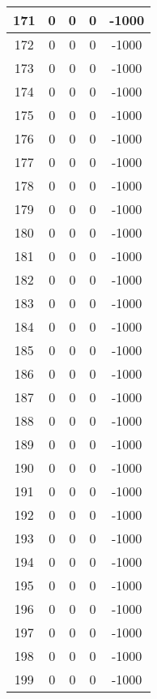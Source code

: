 \documentclass[letterpaper, 12pt]{article}
\begin{document}
\begin{longtable}{|c|c|c|c|c|}
\hline
171 & 0 & 0 & 0 & -1000 \\
\hline
172 & 0 & 0 & 0 & -1000 \\
\hline
173 & 0 & 0 & 0 & -1000 \\
\hline
174 & 0 & 0 & 0 & -1000 \\
\hline
175 & 0 & 0 & 0 & -1000 \\
\hline
176 & 0 & 0 & 0 & -1000 \\
\hline
177 & 0 & 0 & 0 & -1000 \\
\hline
178 & 0 & 0 & 0 & -1000 \\
\hline
179 & 0 & 0 & 0 & -1000 \\
\hline
180 & 0 & 0 & 0 & -1000 \\
\hline
181 & 0 & 0 & 0 & -1000 \\
\hline
182 & 0 & 0 & 0 & -1000 \\
\hline
183 & 0 & 0 & 0 & -1000 \\
\hline
184 & 0 & 0 & 0 & -1000 \\
\hline
185 & 0 & 0 & 0 & -1000 \\
\hline
186 & 0 & 0 & 0 & -1000 \\
\hline
187 & 0 & 0 & 0 & -1000 \\
\hline
188 & 0 & 0 & 0 & -1000 \\
\hline
189 & 0 & 0 & 0 & -1000 \\
\hline
190 & 0 & 0 & 0 & -1000 \\
\hline
191 & 0 & 0 & 0 & -1000 \\
\hline
192 & 0 & 0 & 0 & -1000 \\
\hline
193 & 0 & 0 & 0 & -1000 \\
\hline
194 & 0 & 0 & 0 & -1000 \\
\hline
195 & 0 & 0 & 0 & -1000 \\
\hline
196 & 0 & 0 & 0 & -1000 \\
\hline
197 & 0 & 0 & 0 & -1000 \\
\hline
198 & 0 & 0 & 0 & -1000 \\
\hline
199 & 0 & 0 & 0 & -1000 \\
\hline
\end{longtable}
\end{document}
